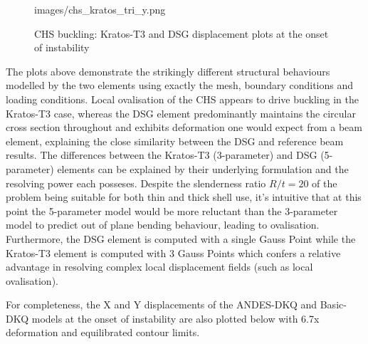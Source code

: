 \begin{figure}[H]
{		{images/chs_kratos_tri_y.png}}
	\caption{\label{chs buckling pics1}CHS buckling: Kratos-T3 and DSG displacement plots at the onset of instability}
\end{figure}

The plots above demonstrate the strikingly different structural behaviours modelled by the two elements using exactly the mesh, boundary conditions and loading conditions. Local ovalisation of the CHS appears to drive buckling in the Kratos-T3 case, whereas the DSG element predominantly maintains the circular cross section throughout and exhibits deformation one would expect from a beam element, explaining the close similarity between the DSG and reference beam results. The differences between the Kratos-T3 (3-parameter) and DSG (5-parameter) elements can be explained by their underlying formulation and the resolving power each posseses. Despite the slenderness ratio $R/t = 20$ of the problem being suitable for both thin and thick shell use, it's intuitive that at this point the 5-parameter model would be more reluctant than the 3-parameter model to predict out of plane bending behaviour, leading to ovalisation. Furthermore, the DSG element is computed with a single Gauss Point while the Kratos-T3 element is computed with 3 Gauss Points which confers a relative advantage in resolving complex local displacement fields (such as local ovalisation).

For completeness, the X and Y displacements of the ANDES-DKQ and Basic-DKQ models at the onset of instability are also plotted below with 6.7x deformation and equilibrated contour limits.

